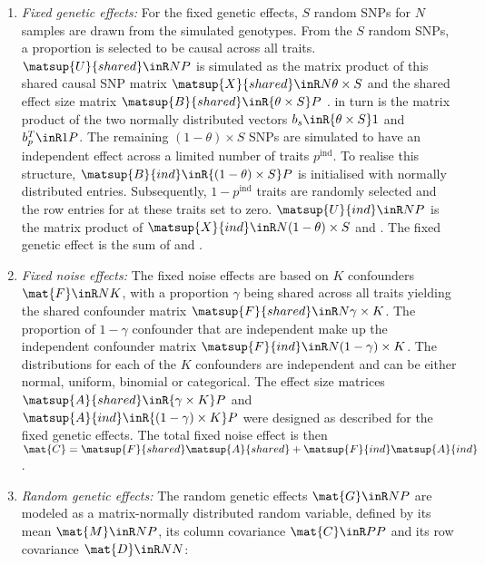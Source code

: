 \begin{enumerate}
\item \textit{Fixed genetic effects:} For the fixed genetic effects, \(S\) random SNPs for \(N\) samples are drawn from the simulated genotypes. From the \(S\) random SNPs, a proportion \tbm{\theta} is selected to be causal across all traits.\(\matsup{U}{shared}\inR N P\) is simulated as the matrix product of this shared causal SNP matrix \(\matsup{X}{shared}\inR N {\theta \times S}\) and the shared effect size matrix \(\matsup{B}{shared} \inR {\theta  \times S} P\) .  in turn is the matrix product of the two normally distributed vectors \(b_s \inR {\theta  \times S} 1\) and \(b_p^T \inR 1 P\). The remaining \((1- \theta ) \times S\) SNPs are simulated to have an independent effect across a limited number of traits \(p^{\text{ind}}\). To realise this structure, \(\matsup{B}{ind} \inR {(1-\theta) \times S} P\) is initialised with normally distributed entries. Subsequently, \(1 - p^{\text{ind}}\) traits are randomly selected and the row entries for  at these traits set to zero. \(\matsup{U}{ind} \inR N P\) is the matrix product of \(\matsup{X}{ind} \inR N {(1 - \theta)  \times S}\) and .
The fixed genetic effect  is the sum of  and .

\item \textit{Fixed noise effects:} The fixed noise effects  are based on \(K\)  confounders \(\mat{F} \inR N K\), with a proportion \(\gamma\) being shared across all traits yielding the shared confounder matrix \(\matsup{F}{shared} \inR N {\gamma \times K} \). The proportion of \(1- \gamma\) confounder that are independent make up the independent confounder matrix \(\matsup{F}{ind} \inR N {(1-\gamma) \times K}\). The distributions for each of the \(K\)  confounders are independent and can be either normal, uniform, binomial or categorical.  The effect size matrices  \(\matsup{A}{shared} \inR {\gamma \times K} P\)  and \(\matsup{A}{ind}  \inR {(1-\gamma) \times K} P \) were designed as described for the fixed genetic effects. The total fixed noise effect is then \(\mat{C} =  \matsup{F}{shared} \matsup{A}{shared} + \matsup{F}{ind}  \matsup{A}{ind} \).

\item \textit{Random genetic effects:} The random genetic effects \(\mat{G} \inR N P\) are modeled as a matrix-normally distributed random variable, defined by its mean \(\mat{M} \inR N P\), its column covariance \(\mat{C} \inR P P\) and its row covariance \(\mat{D} \inR N N\): 


\end{enumerate}
